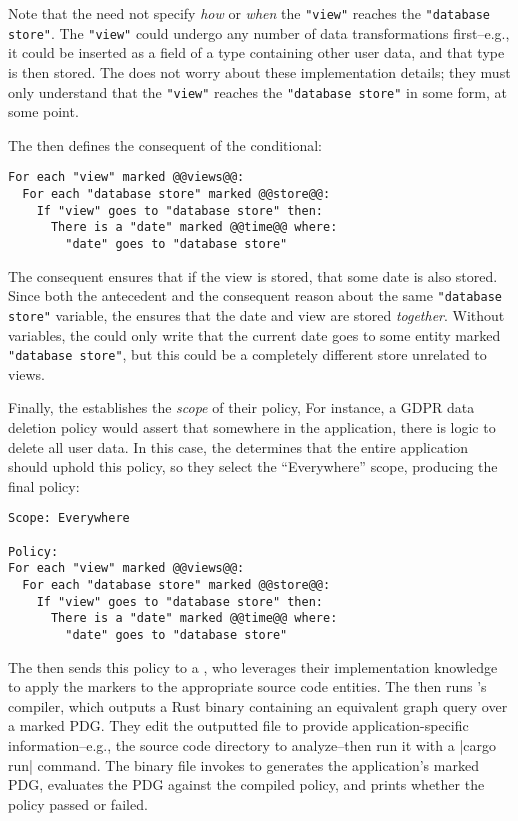 Note that the \ce{} need not specify \emph{how} or \emph{when} the \lstinline[language=CNL]|"view"| reaches the \lstinline[language=CNL]|"database store"|.
%
The \lstinline[language=CNL]|"view"| could undergo any number of data transformations first--e.g., it could be inserted as a field of a type containing other user data,
and that type is then stored.
%
The \ce{} does not worry about these implementation details; they must only understand that the \lstinline[language=CNL]|"view"| reaches the \lstinline[language=CNL]|"database store"|
in some form, at some point.
%

The \ce{} then defines the consequent of the conditional:
\begin{lstlisting}[language=CNL]
For each "view" marked @@views@@:
  For each "database store" marked @@store@@:
    If "view" goes to "database store" then:
      There is a "date" marked @@time@@ where:
        "date" goes to "database store"
\end{lstlisting}
%
%
%
The consequent ensures that if the view is stored, that some date is also stored.
%
Since both the antecedent and the consequent reason about the same \lstinline[language=CNL]|"database store"| variable,
the \ce{} ensures that the date and view are stored \emph{together}.
%
Without variables, the \ce{} could only write that the current date goes to some entity marked \lstinline[language=CNL]|"database store"|,
but this could be a completely different store unrelated to views.

Finally, the \ce{} establishes the \emph{scope} of their policy,
%
For instance, a GDPR data deletion policy would assert that somewhere in the application, there is logic to delete all user data.
%
In this case, the \ce{} determines that the entire application should uphold this policy, so they select the ``Everywhere'' scope,
producing the final policy:

\begin{lstlisting}[language=CNL]
Scope: Everywhere

Policy:
For each "view" marked @@views@@:
  For each "database store" marked @@store@@:
    If "view" goes to "database store" then:
      There is a "date" marked @@time@@ where:
        "date" goes to "database store"
\end{lstlisting}

The \ce{} then sends this policy to a \dev{}, 
who leverages their implementation knowledge to apply the markers to the appropriate source code entities.
%
The \dev{} then runs \syslang{}'s compiler, which outputs a Rust binary containing an equivalent graph query over a marked PDG.
%
They edit the outputted file to provide application-specific information--e.g., the source code directory to analyze--then run it with a |cargo run| command.
%
The binary file invokes \sys{} to generates the application's marked PDG, evaluates the PDG against the compiled policy,
and prints whether the policy passed or failed.
%
